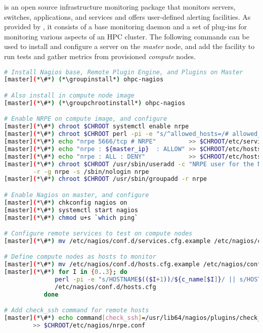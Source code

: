 \Nagios{} is an open source infrastructure monitoring package that monitors
servers, switches, applications, and services and offers user-defined alerting
facilities. As provided by \OHPC{}, it consists of a base monitoring daemon and
a set of plug-ins for monitoring various aspects of an HPC cluster.  The
following commands can be used to install and configure a \Nagios{} server on the {\em
master} node, and add the facility to run tests and gather metrics from
provisioned {\em compute} nodes.

\begin{lstlisting}[language=bash,keywords={},upquote=true]
# Install Nagios base, Remote Plugin Engine, and Plugins on Master
[master](*\#*) (*\groupinstall*) ohpc-nagios

# Also install in compute node image
[master](*\#*) (*\groupchrootinstall*) ohpc-nagios

# Enable NRPE on compute image, and configure
[master](*\#*) chroot $CHROOT systemctl enable nrpe
[master](*\#*) chroot $CHROOT perl -pi -e "s/^allowed_hosts=/# allowed_hosts=/" /etc/nagios/nrpe.cfg
[master](*\#*) echo "nrpe 5666/tcp # NRPE"         >> $CHROOT/etc/services
[master](*\#*) echo "nrpe : ${master_ip}  : ALLOW" >> $CHROOT/etc/hosts.allow
[master](*\#*) echo "nrpe : ALL : DENY"            >> $CHROOT/etc/hosts.allow
[master](*\#*) chroot $CHROOT /usr/sbin/useradd -c "NRPE user for the NRPE service" -d /var/run/nrpe \
        -r -g nrpe -s /sbin/nologin nrpe
[master](*\#*) chroot $CHROOT /usr/sbin/groupadd -r nrpe

# Enable Nagios on master, and configure
[master](*\#*) chkconfig nagios on
[master](*\#*) systemctl start nagios
[master](*\#*) chmod u+s `which ping`

# Configure remote services to test on compute nodes
[master](*\#*) mv /etc/nagios/conf.d/services.cfg.example /etc/nagios/conf.d/services.cfg

# Define compute nodes as hosts to monitor
[master](*\#*) mv /etc/nagios/conf.d/hosts.cfg.example /etc/nagios/conf.d/hosts.cfg
[master](*\#*) for I in {0..3}; do
              perl -pi -e "s/HOSTNAME$(($I+1))/${c_name[$I]}/ || s/HOST$(($I+1))_IP/${c_ip[$I]}/" \
              /etc/nagios/conf.d/hosts.cfg
           done

# Add check_ssh command for remote hosts
[master](*\#*) echo command[check_ssh]=/usr/lib64/nagios/plugins/check_ssh localhost \
        >> $CHROOT/etc/nagios/nrpe.conf
\end{lstlisting}

